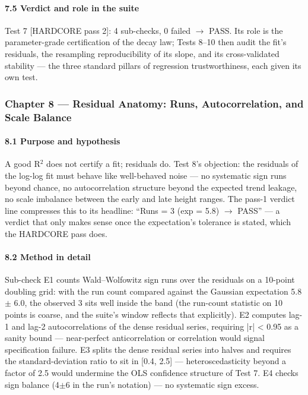 \documentclass[10pt]{article}
\begin{document}
\paragraph{7.5 Verdict and role in the suite}

Test 7 [HARDCORE pass 2]: 4 sub-checks, 0 failed $\rightarrow$ PASS. Its role is the parameter-grade certification of the decay law; Tests 8--10 then audit the fit's residuals, the resampling reproducibility of its slope, and its cross-validated stability --- the three standard pillars of regression trustworthiness, each given its own test.

\subsubsection{Chapter 8 --- Residual Anatomy: Runs, Autocorrelation, and Scale Balance}

\paragraph{8.1 Purpose and hypothesis}

A good R$^2$ does not certify a fit; residuals do. Test 8's objection: the residuals of the log-log fit must behave like well-behaved noise --- no systematic sign runs beyond chance, no autocorrelation structure beyond the expected trend leakage, no scale imbalance between the early and late height ranges. The pass-1 verdict line compresses this to its headline: ``Runs = 3 (exp = 5.8) $\rightarrow$ PASS'' --- a verdict that only makes sense once the expectation's tolerance is stated, which the HARDCORE pass does.

\paragraph{8.2 Method in detail}

Sub-check E1 counts Wald--Wolfowitz sign runs over the residuals on a 10-point doubling grid: with the run count compared against the Gaussian expectation 5.8 $\pm$ 6.0, the observed 3 sits well inside the band (the run-count statistic on 10 points is coarse, and the suite's window reflects that explicitly). E2 computes lag-1 and lag-2 autocorrelations of the dense residual series, requiring |r| < 0.95 as a sanity bound --- near-perfect anticorrelation or correlation would signal specification failure. E3 splits the dense residual series into halves and requires the standard-deviation ratio to sit in [0.4, 2.5] --- heteroscedasticity beyond a factor of 2.5 would undermine the OLS confidence structure of Test 7. E4 checks sign balance (4$\pm$6 in the run's notation) --- no systematic sign excess.
\end{document}
